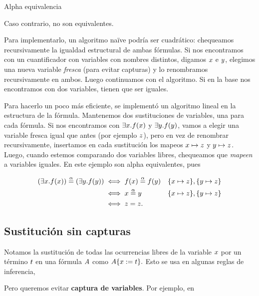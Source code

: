 \begin{definition}{Alpha equivalencia}
\begin{itemize}
        Caso contrario, no son equivalentes.

    \end{itemize}
\end{definition}

Para implementarlo, un algoritmo naïve podría ser cuadrático: chequeamos recursivamente la igualdad estructural de ambas fórmulas. Si nos encontramos con un cuantificador con variables con nombres distintos, digamos $x$ e $y$, elegimos una nueva variable \textit{fresca} (para evitar capturas) y lo renombramos recursivamente en ambos. Luego continuamos con el algoritmo. Si en la base nos encontramos con dos variables, tienen que ser iguales.

Para hacerlo un poco más eficiente, se implementó un algoritmo lineal en la estructura de la fórmula. Mantenemos dos sustituciones de variables, una para cada fórmula. Si nos encontramos con $\exists x . f(x)$ y $\exists y . f(y)$, vamos a elegir una variable fresca igual que antes (por ejemplo $z$), pero en vez de renombrar recursivamente, insertamos en cada sustitución los mapeos $x \mapsto z$ y $y \mapsto z$. Luego, cuando estemos comparando dos variables libres, chequeamos que \textit{mapeen} a variables iguales. En este ejemplo son alpha equivalentes, pues

\begin{align*}
    (\exists x . f(x)) \overset{\alpha}{=} (\exists y . f(y))
    &\iff f(x) \overset{\alpha}{=} f(y)
        &&\{x \mapsto z\}, \{y \mapsto z\}\\
    &\iff x \overset{\alpha}{=} y
        &&\{x \mapsto z\}, \{y \mapsto z\}\\
    &\iff z = z.
\end{align*}

\subsection{Sustitución sin capturas}

Notamos la sustitución de todas las ocurrencias libres de la variable $x$ por un término $t$ en una fórmula $A$ como
\(
    A\{x := t\}.
\)
Esto se usa en algunas reglas de inferencia,

\proofTreeForallE

Pero queremos evitar \textbf{captura de variables}. Por ejemplo, en

